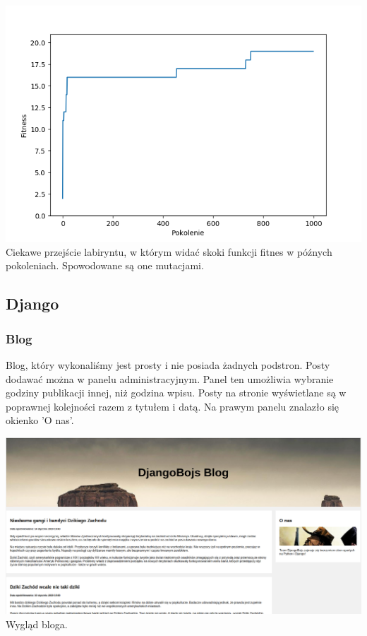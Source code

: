\documentclass{article}
\begin{document}
\begin{center}
\includegraphics[scale=0.69]{Figure_1.png}\\
Ciekawe przejście labiryntu, w którym widać skoki funkcji fitnes w późnych pokoleniach. Spowodowane są one mutacjami.
\end{center}

\subsection{Django}
\subsubsection{Blog}
Blog, który wykonaliśmy jest prosty i nie posiada żadnych podstron. Posty dodawać można w panelu administracyjnym. Panel ten umożliwia wybranie godziny publikacji innej, niż godzina wpisu. Posty na stronie wyświetlane są w poprawnej kolejności razem z tytułem i datą. Na prawym panelu znalazło się okienko 'O nas'.
\\[2cm]
\begin{center}
\includegraphics[scale=0.35]{blog.png}\\
Wygląd bloga.
\end{center}
\end{document}
